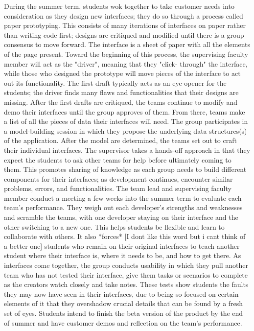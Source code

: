 During the summer term, students wok together to take customer needs into consideration as they design new interfaces; they do so through a process called paper prototyping. This consists of many iterations of interfaces on paper rather than writing code first; designs are critiqued and modified until there is a group consensus to move forward. The interface is a sheet of paper with all the elements of the page present. Toward the beginning of this process, the supervising faculty member will act as the "driver", meaning that they "click- through" the interface, while those who designed the prototype will move pieces of the interface to act out its functionality. The first draft typically acts as an eye-opener for the students; the driver finds many flaws and functionalities that their designs are missing. After the first drafts are critiqued, the teams continue to modify and demo their interfaces until the group approves of them. From there, teams make a list of all the pieces of data their interfaces will need. The group participates in a model-building session in which they propose the underlying data structures(s) of the application.%
After the model are determined, the teams set out to craft their individual interfaces. The supervisor takes a hands-off approach in that they expect the students to ask other teams for help before ultimately coming to them. This promotes sharing of knowledge as each group needs to build different components for their interfaces; as development continues, encounter similar problems, errors, and functionalities.
The team lead and supervising faculty member conduct a meeting a few weeks into the summer term to evaluate each team's performance. They weigh out each developer's strengths and weaknesses and scramble the teams, with one developer staying on their interface and the other switching to a new one. This helps students be flexible and learn to collaborate with others. It also *forces* [I dont like this word but i cant think of a better one] students who remain on their original interfaces to teach another student where their interface is, where it needs to be, and how to get there. As interfaces come together, the group conducts usability \cite{usabilitytesting} in which they pull another team who has not tested their interface, give them tasks or scenarios to complete as the creators watch closely and take notes. These tests show students the faults they may now have seen in their interfaces, due to being so focused on certain elements of it that they overshadow crucial details that can be found by a fresh set of eyes. Students intend to finish the beta version of the product by the end of summer and have customer demos and reflection on the team’s performance.
